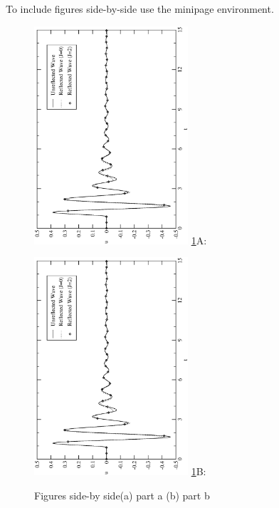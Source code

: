 To include figures side-by-side use the minipage environment.

\begin{figure}[ht]
\begin{minipage}{0.45\linewidth}
\begin{center}
\includegraphics[width=2.25in,angle=-90]{Waves.eps}
\vspace{0in}\ref{sbys}A:
\end{center}
\end{minipage} \hfill
\begin{minipage}{0.45\linewidth}
\begin{center}
\includegraphics[width=2.25in,angle=-90]{Waves.eps}
\vspace{0in}\ref{sbys}B:
\end{center}
\end{minipage}

\caption{Figures side-by side\newline (a) part a (b) part b}\label{sbys}

\end{figure}

